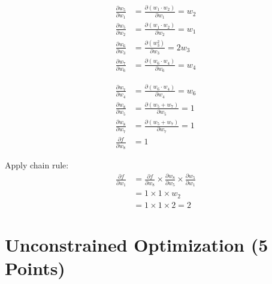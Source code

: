 \documentclass[12pt, xcolor=dvipsnames,svgnames,x11names]{article}
\begin{document}
\begin{answerbox}
\bigskip

\noindent
\begin{minipage}[t]{0.48\textwidth}
\begin{equation}
\begin{aligned}
\frac{\partial w_5}{\partial w_1} &= \frac{\partial (w_1 \cdot w_2)}{\partial w_1} = w_2\\[4pt]
\frac{\partial w_5}{\partial w_2} &= \frac{\partial (w_1 \cdot w_2)}{\partial w_2} = w_1\\[4pt]
\frac{\partial w_6}{\partial w_3} &= \frac{\partial (w_3^2)}{\partial w_3} = 2w_3\\[4pt]
\frac{\partial w_7}{\partial w_6} &= \frac{\partial (w_6 \cdot w_4)}{\partial w_6} = w_4
\end{aligned}
\end{equation}
\end{minipage}
\hfill
\begin{minipage}[t]{0.48\textwidth}
\begin{equation}
\begin{aligned}
\frac{\partial w_7}{\partial w_4} &= \frac{\partial (w_6 \cdot w_4)}{\partial w_4} = w_6\\[4pt]
\frac{\partial w_8}{\partial w_5} &= \frac{\partial (w_5 + w_7)}{\partial w_5} = 1\\[4pt]
\frac{\partial w_8}{\partial w_7} &= \frac{\partial (w_5 + w_7)}{\partial w_7} = 1\\[4pt]
\frac{\partial f}{\partial w_8} &= 1
\end{aligned}
\end{equation}
\end{minipage}

\bigskip

\noindent Apply chain rule:
\begin{equation}
\begin{aligned}
\frac{\partial f}{\partial w_1}
  &= \frac{\partial f}{\partial w_8} \times \frac{\partial w_8}{\partial w_5} \times \frac{\partial w_5}{\partial w_1}\\[4pt]
  &= 1 \times 1 \times w_2\\[4pt]
  &= 1 \times 1 \times 2 = 2
\end{aligned}
\end{equation}
\end{answerbox}

\section{Unconstrained Optimization (5 Points)}
\end{document}
